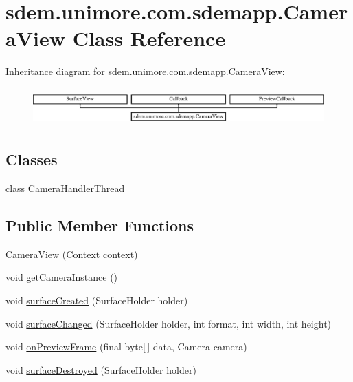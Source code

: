 \hypertarget{classsdem_1_1unimore_1_1com_1_1sdemapp_1_1_camera_view}{\section{sdem.\+unimore.\+com.\+sdemapp.\+Camera\+View Class Reference}
\label{classsdem_1_1unimore_1_1com_1_1sdemapp_1_1_camera_view}
}
Inheritance diagram for sdem.\+unimore.\+com.\+sdemapp.\+Camera\+View\+:\begin{figure}[H]
\begin{center}
\leavevmode
\includegraphics[height=1.464052cm]{classsdem_1_1unimore_1_1com_1_1sdemapp_1_1_camera_view}
\end{center}
\end{figure}
\subsection*{Classes}
\begin{DoxyCompactItemize}
\item 
class \hyperlink{classsdem_1_1unimore_1_1com_1_1sdemapp_1_1_camera_view_1_1_camera_handler_thread}{Camera\+Handler\+Thread}
\end{DoxyCompactItemize}
\subsection*{Public Member Functions}
\begin{DoxyCompactItemize}
\item 
\hyperlink{classsdem_1_1unimore_1_1com_1_1sdemapp_1_1_camera_view_af5ea121550990df11719c2af26240ac2}{Camera\+View} (Context context)
\item 
void \hyperlink{classsdem_1_1unimore_1_1com_1_1sdemapp_1_1_camera_view_a67b6b078d0431699ce46317d9286158f}{get\+Camera\+Instance} ()
\item 
void \hyperlink{classsdem_1_1unimore_1_1com_1_1sdemapp_1_1_camera_view_ace511ad999943fe26880cad904a9ceec}{surface\+Created} (Surface\+Holder holder)
\item 
void \hyperlink{classsdem_1_1unimore_1_1com_1_1sdemapp_1_1_camera_view_a9e58ea3f8f605797b28cd41c9fd4c973}{surface\+Changed} (Surface\+Holder holder, int format, int width, int height)
\item 
void \hyperlink{classsdem_1_1unimore_1_1com_1_1sdemapp_1_1_camera_view_a25879df1d6c2e44dbfb06c3545f01520}{on\+Preview\+Frame} (final byte\mbox{[}$\,$\mbox{]} data, Camera camera)
\item 
void \hyperlink{classsdem_1_1unimore_1_1com_1_1sdemapp_1_1_camera_view_a9a27054b8ad448e20eabb5b468e8257d}{surface\+Destroyed} (Surface\+Holder holder)
\end{DoxyCompactItemize}
